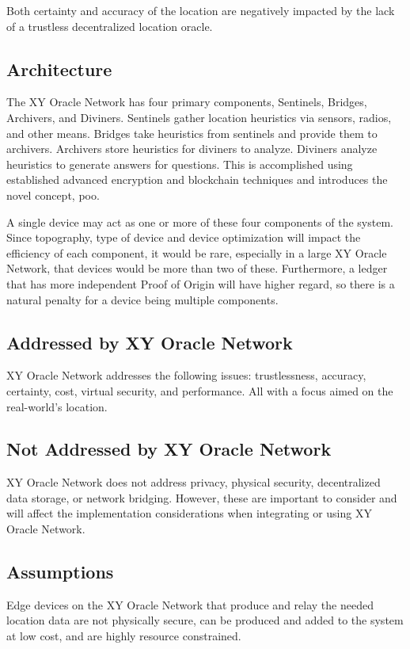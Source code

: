 \documentclass{article}
\begin{document}
Both certainty and accuracy of the location are negatively impacted by the lack of a trustless decentralized location oracle.

\subsection {Architecture}
The XY Oracle Network has four primary components, Sentinels, Bridges, Archivers, and Diviners.  Sentinels gather location heuristics via sensors, radios, and other means.  Bridges take heuristics from sentinels and provide them to archivers.  Archivers store heuristics for diviners to analyze.  Diviners analyze heuristics to generate answers for questions.  This is accomplished using established advanced encryption and blockchain techniques and introduces the novel concept, \gls{poo}.

A single device may act as one or more of these four components of the system.  Since topography, type of device and device optimization will impact the efficiency of each component, it would be rare, especially in a large XY Oracle Network, that devices would be more than two of these.  Furthermore, a ledger that has more independent Proof of Origin will have higher regard, so there is a natural penalty for a device being multiple components.

\subsection {Addressed by XY Oracle Network}
XY Oracle Network addresses the following issues: trustlessness, accuracy, certainty, cost, virtual security, and performance. All with a focus aimed on the real-world's location.

\subsection {Not Addressed by XY Oracle Network}
XY Oracle Network does not address privacy, physical security, decentralized data storage, or network bridging.  However, these are important to consider and will affect the implementation considerations when integrating or using XY Oracle Network.

\subsection {Assumptions}
Edge devices on the XY Oracle Network that produce and relay the needed location data are not physically secure, can be produced and added to the system at low cost, and are highly resource constrained.
\end{document}
